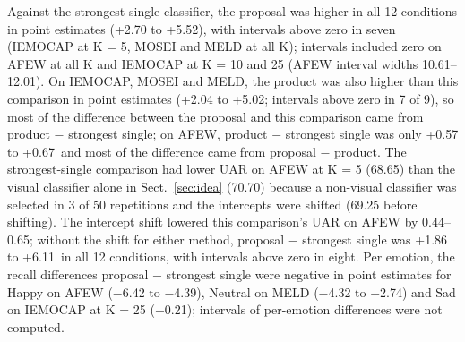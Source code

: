 Against the strongest single classifier, the proposal was higher in all 12 conditions in point estimates (+2.70 to +5.52\pt), with intervals above zero in seven (IEMOCAP at K = 5, MOSEI and MELD at all K); intervals included zero on AFEW at all K and IEMOCAP at K = 10 and 25 (AFEW interval widths 10.61--12.01\pt). On IEMOCAP, MOSEI and MELD, the product was also higher than this comparison in point estimates (+2.04 to +5.02\pt; intervals above zero in 7 of 9), so most of the difference between the proposal and this comparison came from product $-$ strongest single; on AFEW, product $-$ strongest single was only +0.57 to +0.67\pt\ and most of the difference came from proposal $-$ product. The strongest-single comparison had lower UAR on AFEW at K = 5 (68.65) than the visual classifier alone in Sect.~\ref{sec:idea} (70.70) because a non-visual classifier was selected in 3 of 50 repetitions and the intercepts were shifted (69.25 before shifting). The intercept shift lowered this comparison's UAR on AFEW by 0.44--0.65\pt; without the shift for either method, proposal $-$ strongest single was +1.86 to +6.11\pt\ in all 12 conditions, with intervals above zero in eight. Per emotion, the recall differences proposal $-$ strongest single were negative in point estimates for Happy on AFEW ($-$6.42 to $-$4.39\pt), Neutral on MELD ($-$4.32 to $-$2.74\pt) and Sad on IEMOCAP at K = 25 ($-$0.21\pt); intervals of per-emotion differences were not computed.

